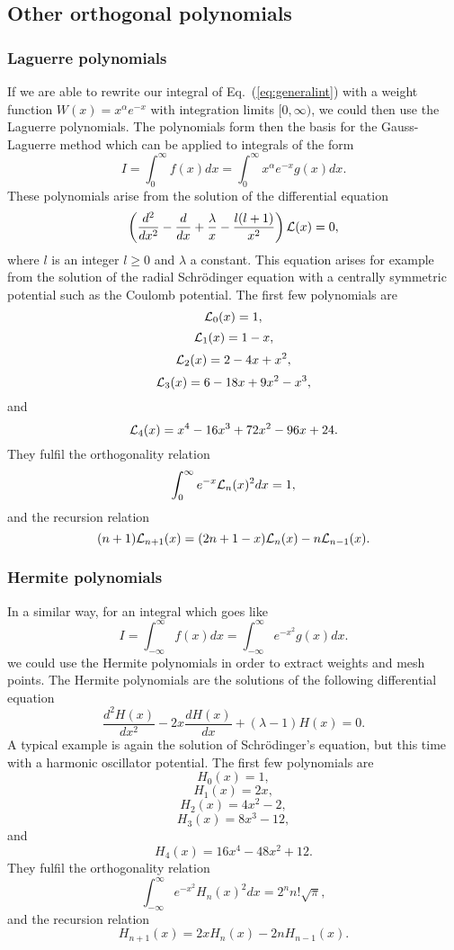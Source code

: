 \subsection{Other orthogonal polynomials}

\subsubsection{Laguerre polynomials}
If we are able to rewrite our integral of Eq.\ (\ref{eq:generalint}) with a
weight function $W(x)=x^{\alpha}e^{-x}$ with integration limits 
$[0,\infty)$, we could then use the Laguerre polynomials.
The polynomials form then the basis for the Gauss-Laguerre method which can be applied
to integrals of the form
\[ 
   I=\int_0^{\infty}f(x)dx =\int_0^{\infty}x^{\alpha}e^{-x}g(x)dx.
\]
These polynomials arise from the solution of the differential
equation
\[
\left(\frac{d^2 }{dx^2}-\frac{d }{dx}+\frac{\lambda}{x}-\frac{l(l+1)}{x^2}\right){\cal L}(x)=0,
\]
where $l$ is an integer $l\ge 0$ and $\lambda$ a constant. This equation
arises for example from the solution of the radial Schr\"odinger equation with 
a centrally symmetric potential such as the Coulomb potential.
The first few polynomials are
\[
   {\cal L}_0(x)=1,
\]
\[
    {\cal L}_1(x)=1-x,
\]
\[
    {\cal L}_2(x)=2-4x+x^2,
\]
\[
    {\cal L}_3(x)=6-18x+9x^2-x^3,
\]
and
\[
    {\cal L}_4(x)=x^4-16x^3+72x^2-96x+24.
\]
They fulfil the orthogonality relation
\[
  \int_{0}^{\infty}e^{-x}{\cal L}_n(x)^2dx=1,
\]
and the recursion relation
\[
  (n+1){\cal L}_{n+1}(x)=(2n+1-x){\cal L}_{n}(x)-n{\cal L}_{n-1}(x).
\]

\subsubsection{Hermite polynomials}

In a similar way, for an integral which goes like
\[ 
   I=\int_{-\infty}^{\infty}f(x)dx =\int_{-\infty}^{\infty}e^{-x^2}g(x)dx.
\]
we could use the Hermite polynomials in order to extract weights and mesh points.
The Hermite polynomials are the solutions of the following differential
equation
\[
   \frac{d^2H(x)}{dx^2}-2x\frac{dH(x)}{dx}+
       (\lambda-1)H(x)=0.
\]
A typical example is again the solution of Schr\"odinger's
equation, but this time with a harmonic oscillator potential.
The first few polynomials are
\[
   H_0(x)=1,
\]
\[
    H_1(x)=2x,
\]
\[
    H_2(x)=4x^2-2,
\]
\[
    H_3(x)=8x^3-12,
\]
and
\[
    H_4(x)=16x^4-48x^2+12.
\]
They fulfil the orthogonality relation
\[
  \int_{-\infty}^{\infty}e^{-x^2}H_n(x)^2dx=2^nn!\sqrt{\pi},
\]
and the recursion relation
\[
  H_{n+1}(x)=2xH_{n}(x)-2nH_{n-1}(x).
\]




